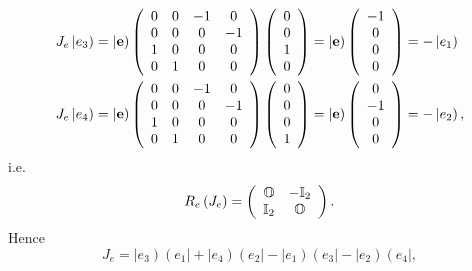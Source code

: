 \documentclass[aps,preprint]{revtex4}%
\begin{document}
\begin{align}
J_{e}\left\vert e_{3}\right)   &  =\left\vert \mathbf{e}\right)  \left(
\begin{array}
[c]{cccc}%
0 & 0 & -1 & 0\\
0 & 0 & 0 & -1\\
1 & 0 & 0 & 0\\
0 & 1 & 0 & 0
\end{array}
\right)  \left(
\begin{array}
[c]{c}%
0\\
0\\
1\\
0
\end{array}
\right)  =\left\vert \mathbf{e}\right)  \left(
\begin{array}
[c]{c}%
-1\\
0\\
0\\
0
\end{array}
\right)  =-\left\vert e_{1}\right)  \\
J_{e}\left\vert e_{4}\right)   &  =\left\vert \mathbf{e}\right)  \left(
\begin{array}
[c]{cccc}%
0 & 0 & -1 & 0\\
0 & 0 & 0 & -1\\
1 & 0 & 0 & 0\\
0 & 1 & 0 & 0
\end{array}
\right)  \left(
\begin{array}
[c]{c}%
0\\
0\\
0\\
1
\end{array}
\right)  =\left\vert \mathbf{e}\right)  \left(
\begin{array}
[c]{c}%
0\\
-1\\
0\\
0
\end{array}
\right)  =-\left\vert e_{2}\right)  ,
\end{align}
i.e.
\begin{equation}
R_{e}\left(  J_{e}\right)  =\left(
\begin{array}
[c]{cc}%
\mathbb{O} & -\mathbb{I}_{2}\\
\mathbb{I}_{2} & \mathbb{O}%
\end{array}
\right)  .
\end{equation}
Hence
\begin{equation}
J_{e}=\left\vert e_{3}\right)  \left(  e_{1}\right\vert +\left\vert
e_{4}\right)  \left(  e_{2}\right\vert -\left\vert e_{1}\right)  \left(
e_{3}\right\vert -\left\vert e_{2}\right)  \left(  e_{4}\right\vert ,
\end{equation}
\end{document}

